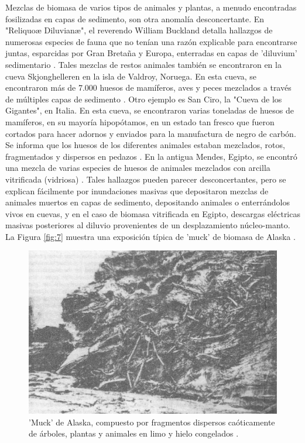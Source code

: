 \documentclass[10pt,twocolumn,letterpaper]{article}
\begin{document}
Mezclas de biomasa de varios tipos de animales y plantas, a menudo encontradas fosilizadas en capas de sedimento, son otra anomalía desconcertante. En "Reliquoæ Diluvianæ", el reverendo William Buckland detalla hallazgos de numerosas especies de fauna que no tenían una razón explicable para encontrarse juntas, esparcidas por Gran Bretaña y Europa, enterradas en capas de 'diluvium' sedimentario \cite{58}. Tales mezclas de restos animales también se encontraron en la cueva Skjonghelleren en la isla de Valdroy, Noruega. En esta cueva, se encontraron más de 7.000 huesos de mamíferos, aves y peces mezclados a través de múltiples capas de sedimento \cite{59}. Otro ejemplo es San Ciro, la "Cueva de los Gigantes", en Italia. En esta cueva, se encontraron varias toneladas de huesos de mamíferos, en su mayoría hipopótamos, en un estado tan fresco que fueron cortados para hacer adornos y enviados para la manufactura de negro de carbón. Se informa que los huesos de los diferentes animales estaban mezclados, rotos, fragmentados y dispersos en pedazos \cite{60,61}. En la antigua Mendes, Egipto, se encontró una mezcla de varias especies de huesos de animales mezclados con arcilla vitrificada (vidriosa) \cite{57}. Tales hallazgos pueden parecer desconcertantes, pero se explican fácilmente por inundaciones masivas que depositaron mezclas de animales muertos en capas de sedimento, depositando animales o enterrándolos vivos en cuevas, y en el caso de biomasa vitrificada en Egipto, descargas eléctricas masivas posteriores al diluvio provenientes de un desplazamiento núcleo-manto. La Figura \ref{fig:7} muestra una exposición típica de 'muck' de biomasa de Alaska \cite{56}.

\begin{figure}[t]
\begin{center}
   \includegraphics[width=1\linewidth]{muck-crop.jpeg}
\end{center}
   \caption{'Muck' de Alaska, compuesto por fragmentos dispersos caóticamente de árboles, plantas y animales en limo y hielo congelados \cite{146}.}
\label{fig:7}
\label{fig:onecol}
\end{figure}
\end{document}
